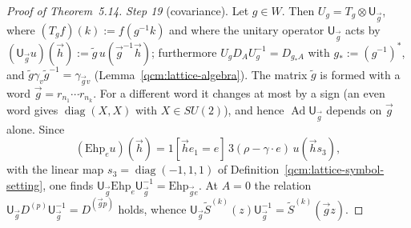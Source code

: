 \documentclass[11pt,letterpaper,reqno]{amsart}
\theoremstyle{definition}
\begin{document}
\begin{proof}[Proof of Theorem~5.14]
\emph{Step 19} (covariance).
Let $g\in W$.
Then $U_g=T_g\otimes\mathsf U_{\vec g}$, where $(T_gf)(k):=f(g^{-1}k)$ and where the unitary operator $\mathsf U_{\vec g}$ acts by $(\mathsf U_{\vec g}u)(\vec h):=\tilde g\,u(\vec g^{-1}\vec h)$; furthermore $U_gD_AU_g^{-1}=D_{g_*A}$ with $g_*:=(g^{-1})^*$, and $\tilde g\gamma_v\tilde g^{-1}=\gamma_{\vec gv}$ (Lemma~\ref{qcm:lattice-algebra}).
The matrix $\tilde g$ is formed with a word $\vec g=r_{n_1}\cdots r_{n_k}$.
For a different word it changes at most by a sign (an even word gives $\operatorname{diag}(X,X)$ with $X\in SU(2)$), and hence $\operatorname{Ad}\mathsf U_{\vec g}$ depends on $\vec g$ alone.
Since
\begin{equation*}
(\mathrm{Ehp}_eu)(\vec h)=1[\vec he_1=e]\,3(\rho-\gamma\cdot e)\,u(\vec hs_3),
\end{equation*}
with the linear map $s_3=\operatorname{diag}(-1,1,1)$ of Definition~\ref{qcm:lattice-symbol-setting}, one finds $\mathsf U_{\vec g}\mathrm{Ehp}_e\mathsf U_{\vec g}^{-1}=\allowbreak \mathrm{Ehp}_{\vec ge}$.
At $A=0$ the relation $\mathsf U_{\vec g}D^{(p)}\mathsf U_{\vec g}^{-1}=D^{(\vec gp)}$ holds, whence $\mathsf U_{\vec g}\tilde S^{(k)}(z)\mathsf U_{\vec g}^{-1}=\allowbreak \tilde S^{(k)}(\vec gz)$.


\end{proof}
\end{document}
